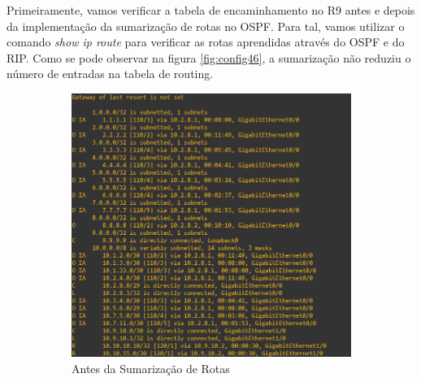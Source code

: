\documentclass[11pt,english, openright, oneside]{book}
\begin{document}
\par Primeiramente, vamos verificar a tabela de encaminhamento no R9 antes e depois da implementação da sumarização de rotas no OSPF. Para tal, vamos utilizar o comando \textit{show ip route} para verificar as rotas aprendidas através do OSPF e do RIP. Como se pode observar na figura \ref{fig:config46}, a sumarização não reduziu o número de entradas na tabela de routing.
\vspace{0.2cm}

\begin{figure}[h]
  \centering
  \begin{subfigure}{.51\textwidth}
      \centering
      \includegraphics[width=1\linewidth]{imagens/Tarefa5/25.before_show_ip_route_R9.png}
      \caption{Antes da Sumarização de Rotas}
  \end{subfigure}%
  \begin{subfigure}{.49\textwidth}
      \centering

\end{subfigure}
\end{figure}
\end{document}
